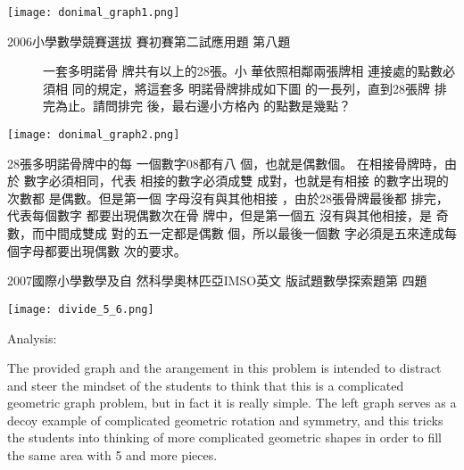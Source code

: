 \documentclass[12pt]{article}
\begin{document}
\newpage

\begin{center}
\texttt{[image: donimal\_graph1.png]}
\end{center}%

\begin{description}
\item[2006小學數學競賽選拔%
賽初賽第二試應用題%
第八題] 一套多明諾骨%
牌共有以上的28張。小%
華依照相鄰兩張牌相%
連接處的點數必須相%
同的規定，將這套多%
明諾骨牌排成如下圖%
的一長列，直到28張牌%
排完為止。請問排完%
後，最右邊小方格內%
的點數是幾點？
\end{description}

\begin{center}
\texttt{[image: donimal\_graph2.png]}
\end{center}%

\bigskip

28張多明諾骨牌中的每%
一個數字08都有八%
個，也就是偶數個。%
在相接骨牌時，由於%
數字必須相同，代表%
相接的數字必須成雙%
成對，也就是有相接%
的數字出現的次數都%
是偶數。但是第一個%
字母沒有與其他相接%
，由於28張骨牌最後都%
排完，代表每個數字%
都要出現偶數次在骨%
牌中，但是第一個五%
沒有與其他相接，是%
奇數，而中間成雙成%
對的五一定都是偶數%
個，所以最後一個數%
字必須是五來達成每%
個字母都要出現偶數%
次的要求。

\newpage

\begin{description}
\item[2007國際小學數學及自%
然科學奧林匹亞IMSO英文%
版試題數學探索題第%
四題] 
\end{description}

\texttt{[image: divide\_5\_6.png]}%

\bigskip

Analysis:

The provided graph and the arangement in this problem is intended to
distract and steer the mindset of the students to think that this is a
complicated geometric graph problem, but in fact it is really simple. The
left graph serves as a decoy example of complicated geometric rotation and
symmetry, and this tricks the students into thinking of more complicated
geometric shapes in order to fill the same area with 5 and more pieces.
\end{document}
